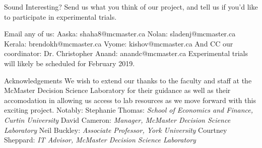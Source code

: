 \documentclass[22pt]{beamer}
\begin{document}
\begin{frame}[fragile]
\begin{textblock}{7.25}
\begin{block}{Sound Interesting?}\newline
Send us what you think of our project, and tell us if you'd like to participate in experimental trials.

\newline
\newline
Email any of us: \newline
\newline
Aaska: shaha8@mcmaster.ca\newline
Nolan: sladenj@mcmaster.ca\newline
Kerala: brendokh@mcmaster.ca\newline
Vyome: kishov@mcmaster.ca\newline
\newline
And CC our coordinator:\newline
Dr. Christopher Anand: anandc@mcmaster.ca
\newline
\newline
Experimental trials will likely be scheduled for February 2019.
\end{block}


\begin{block}{Acknowledgements}\newline
We wish to extend our thanks to the faculty and staff at the McMaster Decision Science Laboratory for their guidance as well as their accomodation in allowing us access to lab resources as we move forward with this exciting project. Notably:\newline
\newline
Stephanie Thomas: \textit{School of Economics and Finance, Curtin University}\newline
David Cameron: \textit{Manager, McMaster Decision Science Laboratory}\newline
Neil Buckley: \textit{Associate Professor, York University}\newline
Courtney Sheppard: \textit{IT Advisor, McMaster Decision Science Laboratory}
\end{block}

% 

\begin{comment}
\begin{block}{References}
\setbeamertemplate{bibliography item}{\insertbiblabel}

{\scriptsize
}
\end{block}
\vspace{-1.8mm}
\end{comment}
\end{textblock}


\end{frame}
\end{document}
